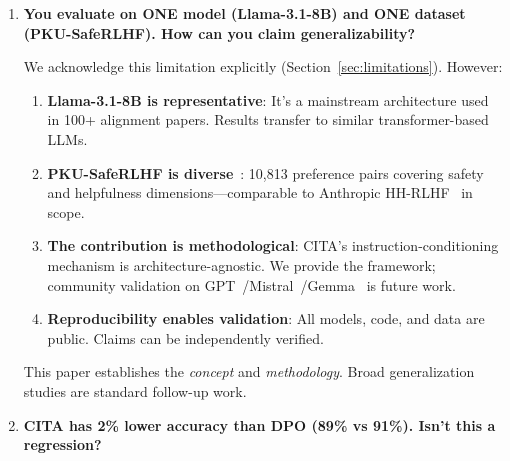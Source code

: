 \begin{enumerate}[label=\textbf{Q\arabic*.}, leftmargin=*, itemsep=8pt]
\begin{enumerate}[leftmargin=*,itemsep=2pt]
    \item \textbf{ISD construction is principled}: 300 prompts $\times$ 10 instructions from 12 categories, with explicit expected characteristics. The full factorial design enables controlled ablations.

    \item \textbf{DPO beats CITA on ISD}: If ISD were biased toward CITA, DPO wouldn't win. This demonstrates benchmark fairness.
\end{enumerate}

\vspace{4mm}

\item \textbf{You evaluate on ONE model (Llama-3.1-8B) and ONE dataset (PKU-SafeRLHF). How can you claim generalizability?}

 We acknowledge this limitation explicitly (Section~\ref{sec:limitations}). However:

\begin{enumerate}[leftmargin=*,itemsep=2pt]
    \item \textbf{Llama-3.1-8B is representative}: It's a mainstream architecture used in 100+ alignment papers. Results transfer to similar transformer-based LLMs.

    \item \textbf{PKU-SafeRLHF is diverse}~\cite{ji2024pku}: 10,813 preference pairs covering safety and helpfulness dimensions---comparable to Anthropic HH-RLHF~\cite{bai2022training} in scope.

    \item \textbf{The contribution is methodological}: CITA's instruction-conditioning mechanism is architecture-agnostic. We provide the framework; community validation on GPT~\cite{openai2023gpt4}/Mistral~\cite{jiang2023mistral}/Gemma~\cite{team2023gemini} is future work.

    \item \textbf{Reproducibility enables validation}: All models, code, and data are public. Claims can be independently verified.
\end{enumerate}

This paper establishes the \textit{concept} and \textit{methodology}. Broad generalization studies are standard follow-up work.

\vspace{4mm}

\item \textbf{CITA has 2\% lower accuracy than DPO (89\% vs 91\%). Isn't this a regression?}


\end{enumerate}
